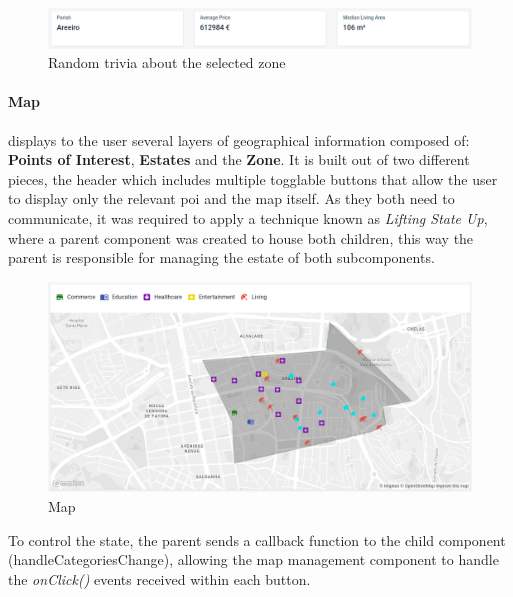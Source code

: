\begin{figure}[h]
	\centering
	\includegraphics[width=1\linewidth]{Chapters/img/frontend/OverviewHeader.png}
	\caption{Random trivia about the selected zone}
	\label{fig:overviewHeader}
\end{figure}

\paragraph{Map} displays to the user several layers of geographical information composed of: \textbf{Points of Interest}, \textbf{Estates} and the \textbf{Zone}. It is built out of two different pieces, the header which includes multiple togglable buttons that allow the user to display only the relevant \acrshort{poi} and the map itself. As they both need to communicate, it was required to apply a technique known as \textit{Lifting State Up}, where a parent component was created to house both children, this way the parent is responsible for managing the estate of both subcomponents.

\begin{figure}[h]
	\centering
	\includegraphics[width=1\linewidth]{Chapters/img/frontend/OverviewMap.png}
	\caption{Map}
	\label{fig:overviewMap}
\end{figure}

To control the state, the parent sends a callback function to the child component (handleCategoriesChange), allowing the map management component to handle the \textit{onClick()} events received within each button.

